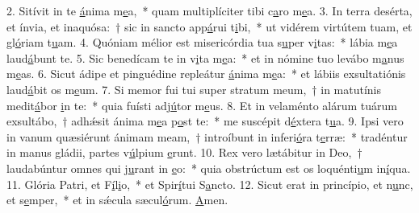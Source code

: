2. Sitívit in te \uline{á}nima m\uline{e}a,~* quam multiplíciter tibi c\uline{a}ro m\uline{e}a.
3. In terra desérta, et ínvia, et inaquósa:~† sic in sancto app\uline{á}rui t\uline{i}bi,~* ut vidérem virtútem tuam, et gl\uline{ó}riam t\uline{u}am.
4. Quóniam mélior est misericórdia tua s\uline{u}per v\uline{i}tas:~* lábia m\uline{e}a laud\uline{á}bunt te.
5. Sic benedícam te in v\uline{i}ta m\uline{e}a:~* et in nómine tuo levábo m\uline{a}nus m\uline{e}as.
6. Sicut ádipe et pinguédine repleátur \uline{á}nima m\uline{e}a:~* et lábiis exsultatiónis laud\uline{á}bit os m\uline{e}um.
7. Si memor fui tui super stratum meum,~† in matutínis medit\uline{á}bor \uline{i}n te:~* quia fuísti adj\uline{ú}tor m\uline{e}us.
8. Et in velaménto alárum tuárum exsultábo,~† adhǽsit ánima m\uline{e}a p\uline{o}st te:~* me suscépit d\uline{é}xtera t\uline{u}a.
9. Ipsi vero in vanum quæsiérunt ánimam meam,~† introíbunt in inferi\uline{ó}ra t\uline{e}rræ:~* tradéntur in manus gládii, partes v\uline{ú}lpium \uline{e}runt.
10. Rex vero lætábitur in Deo,~† laudabúntur omnes qui j\uline{u}rant in \uline{e}o:~* quia obstrúctum est os loquénti\uline{u}m in\uline{í}qua.
11. Glória Patri, et F\uline{í}l\uline{i}o,~* et Spir\uline{í}tui S\uline{a}ncto.
12. Sicut erat in princípio, et n\uline{u}nc, et s\uline{e}mper,~* et in sǽcula sæcul\uline{ó}rum. \uline{A}men.
